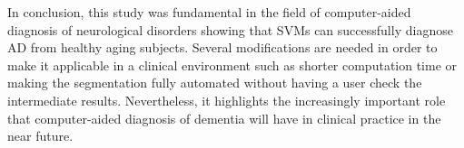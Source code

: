 \documentclass[11pt,a4paper,oneside]{report}
\begin{document}
In conclusion, this study was fundamental in the field of computer-aided diagnosis of neurological disorders showing that SVMs can successfully diagnose AD from healthy aging subjects. Several modifications are needed in order to make it applicable in a clinical environment such as shorter computation time or making the segmentation fully automated without having a user check the intermediate results. Nevertheless, it highlights the increasingly important role that computer-aided diagnosis of dementia will have in clinical practice in the near future.


\nocite{*} %


\end{document}

